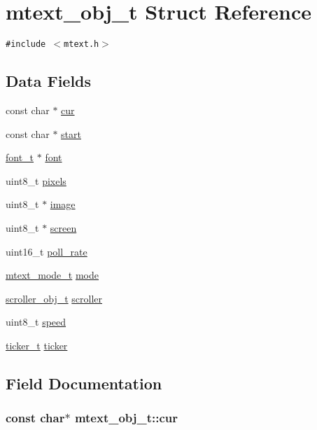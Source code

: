 \hypertarget{structmtext__obj__t}{
\section{mtext\_\-obj\_\-t Struct Reference}
\label{structmtext__obj__t}
}
{\tt \#include $<$mtext.h$>$}

\subsection*{Data Fields}
\begin{CompactItemize}
\item 
const char $\ast$ \hyperlink{structmtext__obj__t_99fcc3140be2c8f11b441c3ce2d2ebad}{cur}
\item 
const char $\ast$ \hyperlink{structmtext__obj__t_17ae4a793386ebac51ba76800812327d}{start}
\item 
\hyperlink{structfont__t}{font\_\-t} $\ast$ \hyperlink{structmtext__obj__t_9c8d6b873815f4b460c8e08b339c6814}{font}
\item 
uint8\_\-t \hyperlink{structmtext__obj__t_3952a63b6d568b8e6c096c6b51fb8fd6}{pixels}
\item 
uint8\_\-t $\ast$ \hyperlink{structmtext__obj__t_63674b367a060ae8a03560115b7faf0c}{image}
\item 
uint8\_\-t $\ast$ \hyperlink{structmtext__obj__t_5e65a906c4a26f7b8456a12fd67616c6}{screen}
\item 
uint16\_\-t \hyperlink{structmtext__obj__t_1b64662fd292aea7a90652e601143f36}{poll\_\-rate}
\item 
\hyperlink{mtext_8h_fd147cfb763670119d293594e9e47d76}{mtext\_\-mode\_\-t} \hyperlink{structmtext__obj__t_2091c7edcdf0a78bc0c7798af6fca3b5}{mode}
\item 
\hyperlink{structscroller__obj__t}{scroller\_\-obj\_\-t} \hyperlink{structmtext__obj__t_fa795a260168cc076d1b17e2e3b70d84}{scroller}
\item 
uint8\_\-t \hyperlink{structmtext__obj__t_ad2f05313e8998327f0119f70cec688c}{speed}
\item 
\hyperlink{structticker__t}{ticker\_\-t} \hyperlink{structmtext__obj__t_7a47047f31618b632c1776a47416f339}{ticker}
\end{CompactItemize}


\subsection{Field Documentation}
\hypertarget{structmtext__obj__t_99fcc3140be2c8f11b441c3ce2d2ebad}{
\subsubsection{\setlength{\rightskip}{0pt plus 5cm}const char$\ast$ {\bf mtext\_\-obj\_\-t::cur}}}
\label{structmtext__obj__t_99fcc3140be2c8f11b441c3ce2d2ebad}




